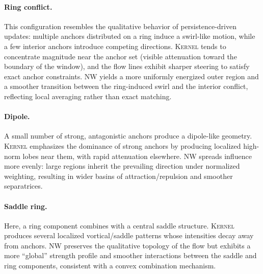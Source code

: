 \documentclass{article} %
\theoremstyle{plain}
\theoremstyle{definition}
\theoremstyle{remark}
\begin{document}
\paragraph{Ring conflict.}
This configuration resembles the qualitative behavior of persistence-driven updates: multiple anchors distributed on a ring
induce a swirl-like motion, while a few interior anchors introduce competing directions.
\textsc{Kernel} tends to concentrate magnitude near the anchor set (visible attenuation toward the boundary of the window),
and the flow lines exhibit sharper steering to satisfy exact anchor constraints.
\textsc{NW} yields a more uniformly energized outer region and a smoother transition between the ring-induced swirl and the
interior conflict, reflecting local averaging rather than exact matching.


\paragraph{Dipole.}
A small number of strong, antagonistic anchors produce a dipole-like geometry.
\textsc{Kernel} emphasizes the dominance of strong anchors by producing localized high-norm lobes near them, with rapid
attenuation elsewhere.
\textsc{NW} spreads influence more evenly: large regions inherit the prevailing direction under normalized weighting,
resulting in wider basins of attraction/repulsion and smoother separatrices.

\paragraph{Saddle ring.}
Here, a ring component combines with a central saddle structure.
\textsc{Kernel} produces several localized vortical/saddle patterns whose intensities decay away from anchors.
\textsc{NW} preserves the qualitative topology of the flow but exhibits a more ``global'' strength profile and smoother
interactions between the saddle and ring components, consistent with a convex combination mechanism.
\end{document}
